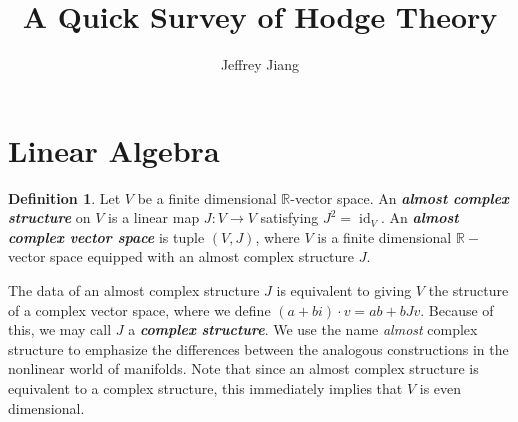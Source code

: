 \documentclass[psamsfonts, 12pt]{amsart}
\theoremstyle{definition}
\newtheorem{defn}[thm]{Definition}
\theoremstyle{remark}
\newcommand{\R}{\mathbb{R}}
\newcommand{\ib}[1]{\textbf{\textit{#1}}}
\DeclareMathOperator{\id}{id}
\begin{document}
%
\author{Jeffrey Jiang}
%
\title{A Quick Survey of Hodge Theory}
%
\maketitle
%
\tableofcontents
%
\section{Linear Algebra}
%
\begin{defn}
Let $V$ be a finite dimensional $\R$-vector space. An \ib{almost complex structure} on
$V$ is a linear map $J : V \to V$ satisfying $J^2 = \id_V$. An \ib{almost complex
vector space} is tuple $(V,J)$, where $V$ is a finite dimensional $\R-$vector space
equipped with an almost complex structure $J$.
\end{defn}
%
The data of an almost complex structure $J$ is equivalent to giving $V$ the structure
of a complex vector space, where we define $(a + bi)\cdot v = ab + bJv$. Because of this,
we may call $J$ a \ib{complex structure}. We use the name \emph{almost} complex
structure to emphasize the differences between the analogous constructions in the
nonlinear world of manifolds. Note that since an almost complex structure is equivalent
to a complex structure, this immediately implies that $V$ is even dimensional. \\
\end{document}
